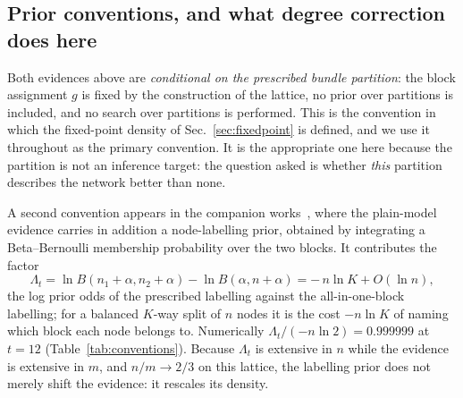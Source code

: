 \documentclass[preprint,12pt]{elsarticle}
\begin{document}
\subsection{Prior conventions, and what degree correction does here}
\label{sec:priors}

Both evidences above are \emph{conditional on the prescribed bundle partition}:
the block assignment $g$ is fixed by the construction of the lattice, no prior
over partitions is included, and no search over partitions is performed. This
is the convention in which the fixed-point density of
Sec.~\ref{sec:fixedpoint} is defined, and we use it throughout as the primary
convention. It is the appropriate one here because the partition is not an
inference target: the question asked is whether \emph{this} partition describes
the network better than none.

A second convention appears in the companion
works~\cite{vazquez2026ringwantsbroken,
vazquez2026communitystructurepseudofractalweb}, where the plain-model evidence
carries in addition a node-labelling prior, obtained by integrating a
Beta--Bernoulli membership probability over the two blocks. It contributes the
factor
\begin{equation}
  \Lambda_t = \ln B(n_1{+}\alpha,n_2{+}\alpha)-\ln B(\alpha,n{+}\alpha)
            = -\,n\ln K + O(\ln n),
  \label{eq:label}
\end{equation}
the log prior odds of the prescribed labelling against the all-in-one-block
labelling; for a balanced $K$-way split of $n$ nodes it is the cost $-n\ln K$
of naming which block each node belongs to. Numerically $\Lambda_t/(-n\ln2)
=0.999999$ at $t=12$ (Table~\ref{tab:conventions}). Because $\Lambda_t$ is
extensive in $n$ while the evidence is extensive in $m$, and $n/m\to2/3$ on
this lattice, the labelling prior does not merely shift the evidence: it
rescales its density.
\end{document}
